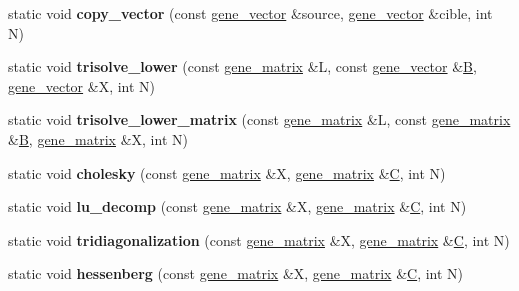 \begin{DoxyCompactItemize}
static void {\bfseries copy\+\_\+vector} (const \hyperlink{group___core___module_class_eigen_1_1_matrix}{gene\+\_\+vector} \&source, \hyperlink{group___core___module_class_eigen_1_1_matrix}{gene\+\_\+vector} \&cible, int N)
\item 
\mbox{\label{classeigen2__interface_a54fa14604cc4b0b1e3242ade3169b3da}} 
static void {\bfseries trisolve\+\_\+lower} (const \hyperlink{group___core___module_class_eigen_1_1_matrix}{gene\+\_\+matrix} \&L, const \hyperlink{group___core___module_class_eigen_1_1_matrix}{gene\+\_\+vector} \&\hyperlink{group___core___module_class_eigen_1_1_matrix}{B}, \hyperlink{group___core___module_class_eigen_1_1_matrix}{gene\+\_\+vector} \&X, int N)
\item 
\mbox{\label{classeigen2__interface_ac52c06543bc30c0527a7f79c2c2b516e}} 
static void {\bfseries trisolve\+\_\+lower\+\_\+matrix} (const \hyperlink{group___core___module_class_eigen_1_1_matrix}{gene\+\_\+matrix} \&L, const \hyperlink{group___core___module_class_eigen_1_1_matrix}{gene\+\_\+matrix} \&\hyperlink{group___core___module_class_eigen_1_1_matrix}{B}, \hyperlink{group___core___module_class_eigen_1_1_matrix}{gene\+\_\+matrix} \&X, int N)
\item 
\mbox{\label{classeigen2__interface_a7aba0565565f8768bbba2bb596358056}} 
static void {\bfseries cholesky} (const \hyperlink{group___core___module_class_eigen_1_1_matrix}{gene\+\_\+matrix} \&X, \hyperlink{group___core___module_class_eigen_1_1_matrix}{gene\+\_\+matrix} \&\hyperlink{group___core___module}{C}, int N)
\item 
\mbox{\label{classeigen2__interface_a2496a534900ab7c5b1efec982222138e}} 
static void {\bfseries lu\+\_\+decomp} (const \hyperlink{group___core___module_class_eigen_1_1_matrix}{gene\+\_\+matrix} \&X, \hyperlink{group___core___module_class_eigen_1_1_matrix}{gene\+\_\+matrix} \&\hyperlink{group___core___module}{C}, int N)
\item 
\mbox{\label{classeigen2__interface_a4a147008360e79e0dd23c1c1cf735522}} 
static void {\bfseries tridiagonalization} (const \hyperlink{group___core___module_class_eigen_1_1_matrix}{gene\+\_\+matrix} \&X, \hyperlink{group___core___module_class_eigen_1_1_matrix}{gene\+\_\+matrix} \&\hyperlink{group___core___module}{C}, int N)
\item 
\mbox{\label{classeigen2__interface_aae6c5d86033789d3e3ba357d16c7bf26}} 
static void {\bfseries hessenberg} (const \hyperlink{group___core___module_class_eigen_1_1_matrix}{gene\+\_\+matrix} \&X, \hyperlink{group___core___module_class_eigen_1_1_matrix}{gene\+\_\+matrix} \&\hyperlink{group___core___module}{C}, int N)
\end{DoxyCompactItemize}


